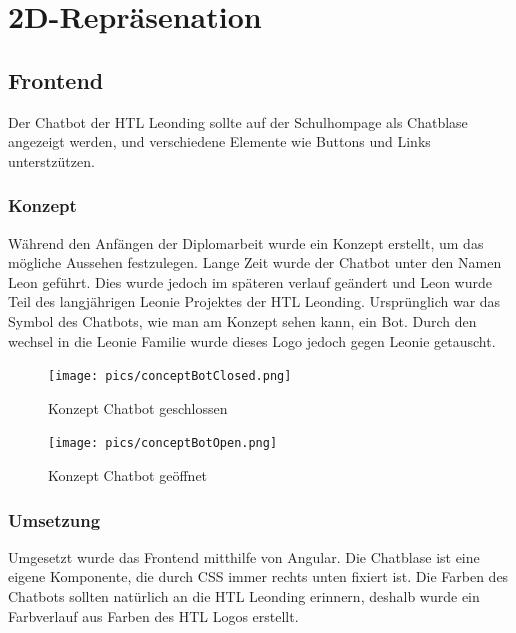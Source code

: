 \section{2D-Repräsenation}

\subsection{Frontend}
Der Chatbot der HTL Leonding sollte auf der Schulhompage als Chatblase angezeigt werden, und verschiedene Elemente wie Buttons und Links unterstzützen.
\subsubsection{Konzept}
Während den Anfängen der Diplomarbeit wurde ein Konzept erstellt, um das mögliche Aussehen festzulegen. Lange Zeit wurde der Chatbot unter den Namen Leon geführt. 
Dies wurde jedoch im späteren verlauf geändert und Leon wurde Teil des langjährigen Leonie Projektes der HTL Leonding.
Ursprünglich war das Symbol des Chatbots, wie man am Konzept sehen kann, ein Bot. Durch den wechsel in die Leonie Familie wurde dieses Logo jedoch gegen Leonie getauscht.
\begin{figure}[hbt!]
    \centering
    \texttt{[image: pics/conceptBotClosed.png]}
    \caption{Konzept Chatbot geschlossen}
    \label{fig:impl:conceptBotClosed}
\end{figure}
\begin{figure}[hbt!]
    \centering
    \texttt{[image: pics/conceptBotOpen.png]}
    \caption{Konzept Chatbot geöffnet}
    \label{fig:impl:conceptBotOpen}
\end{figure}

\subsubsection{Umsetzung}
Umgesetzt wurde das Frontend mitthilfe von Angular. Die Chatblase ist eine eigene Komponente, die durch CSS immer rechts unten fixiert ist. Die Farben des Chatbots sollten natürlich an die HTL Leonding erinnern, deshalb wurde ein Farbverlauf aus Farben des HTL Logos erstellt.

